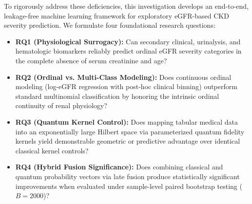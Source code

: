 \documentclass[conference]{IEEEtran}
\begin{document}
To rigorously address these deficiencies, this investigation develops an end-to-end, leakage-free machine learning framework for exploratory eGFR-based CKD severity prediction. We formulate four foundational research questions:
\begin{itemize}
    \item \textbf{RQ1 (Physiological Surrogacy):} Can secondary clinical, urinalysis, and hematologic biomarkers reliably predict ordinal eGFR severity categories in the complete absence of serum creatinine and age?
    \item \textbf{RQ2 (Ordinal vs. Multi-Class Modeling):} Does continuous ordinal modeling (log-eGFR regression with post-hoc clinical binning) outperform standard multinomial classification by honoring the intrinsic ordinal continuity of renal physiology?
    \item \textbf{RQ3 (Quantum Kernel Control):} Does mapping tabular medical data into an exponentially large Hilbert space via parameterized quantum fidelity kernels yield demonstrable geometric or predictive advantage over identical classical kernel controls?
    \item \textbf{RQ4 (Hybrid Fusion Significance):} Does combining classical and quantum probability vectors via late fusion produce statistically significant improvements when evaluated under sample-level paired bootstrap testing ($B=2000$)?
\end{itemize}
\end{document}
